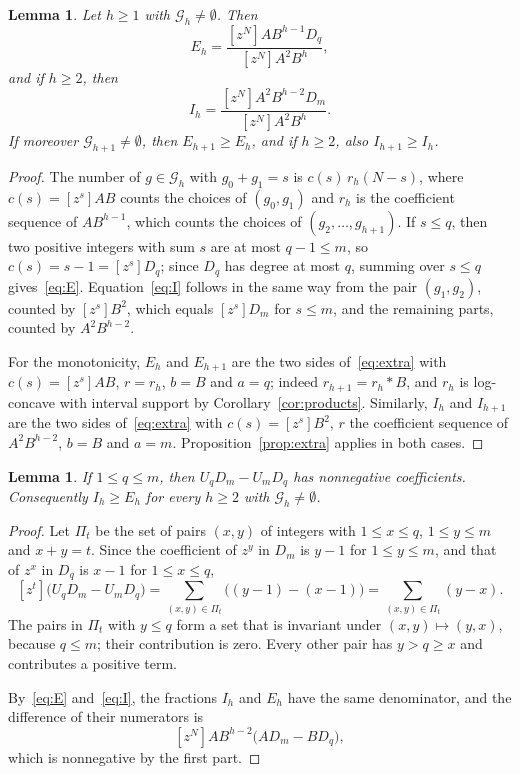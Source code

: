 \documentclass{amsart}
\newtheorem{lemma}[theorem]{Lemma}
\theoremstyle{definition}
\theoremstyle{remark}
\numberwithin{equation}{section}
\newcommand{\cG}{\mathcal{G}}
\newcommand{\coef}[1]{[z^{#1}]}
\begin{document}
\begin{lemma}\label{lem:EI}
Let $h\ge1$ with $\cG_h\neq\emptyset$. Then
\begin{equation}\label{eq:E}
E_h=\frac{\coef{N}AB^{h-1}D_q}{\coef{N}A^2B^h},
\end{equation}
and if $h\ge2$, then
\begin{equation}\label{eq:I}
I_h=\frac{\coef{N}A^2B^{h-2}D_m}{\coef{N}A^2B^h}.
\end{equation}
If moreover $\cG_{h+1}\neq\emptyset$, then $E_{h+1}\ge E_h$, and if $h\ge2$, also $I_{h+1}\ge I_h$.
\end{lemma}

\begin{proof}
The number of $g\in\cG_h$ with $g_0+g_1=s$ is $c(s)\,r_h(N-s)$, where $c(s)=\coef{s}AB$ counts the choices of $(g_0,g_1)$ and $r_h$ is the coefficient sequence of $AB^{h-1}$, which counts the choices of $(g_2,\dots,g_{h+1})$. If $s\le q$, then two positive integers with sum $s$ are at most $q-1\le m$, so $c(s)=s-1=\coef{s}D_q$; since $D_q$ has degree at most $q$, summing over $s\le q$ gives~\eqref{eq:E}. Equation~\eqref{eq:I} follows in the same way from the pair $(g_1,g_2)$, counted by $\coef{s}B^2$, which equals $\coef{s}D_m$ for $s\le m$, and the remaining parts, counted by $A^2B^{h-2}$.

For the monotonicity, $E_h$ and $E_{h+1}$ are the two sides of~\eqref{eq:extra} with $c(s)=\coef{s}AB$, $r=r_h$, $b=B$ and $a=q$; indeed $r_{h+1}=r_h*B$, and $r_h$ is log-concave with interval support by Corollary~\ref{cor:products}. Similarly, $I_h$ and $I_{h+1}$ are the two sides of~\eqref{eq:extra} with $c(s)=\coef{s}B^2$, $r$ the coefficient sequence of $A^2B^{h-2}$, $b=B$ and $a=m$. Proposition~\ref{prop:extra} applies in both cases.
\end{proof}

\begin{lemma}\label{lem:compare}
If $1\le q\le m$, then $U_qD_m-U_mD_q$ has nonnegative coefficients. Consequently $I_h\ge E_h$ for every $h\ge2$ with $\cG_h\neq\emptyset$.
\end{lemma}

\begin{proof}
Let $\Pi_t$ be the set of pairs $(x,y)$ of integers with $1\le x\le q$, $1\le y\le m$ and $x+y=t$. Since the coefficient of $z^y$ in $D_m$ is $y-1$ for $1\le y\le m$, and that of $z^x$ in $D_q$ is $x-1$ for $1\le x\le q$,
\[
\coef{t}\bigl(U_qD_m-U_mD_q\bigr)=\sum_{(x,y)\in \Pi_t}\bigl((y-1)-(x-1)\bigr)=\sum_{(x,y)\in \Pi_t}(y-x).
\]
The pairs in $\Pi_t$ with $y\le q$ form a set that is invariant under $(x,y)\mapsto(y,x)$, because $q\le m$; their contribution is zero. Every other pair has $y>q\ge x$ and contributes a positive term.

By~\eqref{eq:E} and~\eqref{eq:I}, the fractions $I_h$ and $E_h$ have the same denominator, and the difference of their numerators is
\[
\coef{N}AB^{h-2}\bigl(AD_m-BD_q\bigr),
\]
which is nonnegative by the first part.
\end{proof}
\end{document}
